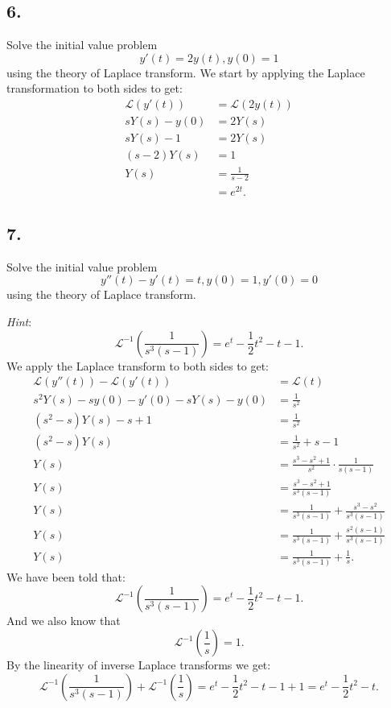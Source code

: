 \subsection*{6.} Solve the initial value problem
\[ 
y'(t) = 2y(t), y(0) = 1
\]
using the theory of Laplace transform.
\bigbreak
We start by applying the Laplace transformation to both sides to get:
\begin{align*}
  \mathcal{L}\left( y'(t) \right) &= \mathcal{L}\left( 2y(t) \right)  \\
  s Y(s) - y(0) &= 2Y(s) \\
  s Y(s) - 1 &= 2Y(s) \\
  \left( s-2 \right) Y(s) &= 1 \\
  Y(s) &= \frac{1}{s - 2} \\
  &=  e^{2t}
.\end{align*}



\subsection*{7.} Solve the initial value problem
\[ 
y''(t) - y'(t) = t, y(0) = 1, y'(0) = 0
\]
using the theory of Laplace transform.

\textit{Hint}:
\[ 
\mathcal{L}^{-1} \left( \frac{1}{s^3 \left( s-1 \right) } \right) = e^{t} - \frac{1}{2}t^2 - t - 1
.\]
\bigbreak
We apply the Laplace transform to both sides to get:
\begin{align*}
  \mathcal{L}\left( y''(t) \right) - \mathcal{L}\left( y'(t) \right) &= \mathcal{L}\left( t \right)  \\
  s^2 Y(s) - sy(0) - y'(0) - s Y(s) - y(0) &= \frac{1}{s^2} \\
  \left( s^2 - s \right) Y(s) - s + 1 &= \frac{1}{s^2} \\
  \left( s^2 - s \right) Y(s) &= \frac{1}{s^2} + s - 1 \\
  Y(s) &= \frac{s^3 - s^2 + 1}{s^2} \cdot \frac{1}{s \left( s - 1 \right) } \\
  Y(s) &= \frac{s^3 - s^2 + 1}{s^3 \left( s-1 \right) }  \\
  Y(s) &= \frac{1}{s^3 \left( s-1 \right) } + \frac{s^3 - s^2}{s^3 \left( s-1 \right) } \\
  Y(s) &= \frac{1}{s^3 \left( s-1 \right) } + \frac{s^2 \left( s-1 \right) }{s^3 \left( s-1 \right) } \\
  Y(s) &= \frac{1}{s^3 \left( s-1 \right) } + \frac{1}{s}
.\end{align*}
We have been told that:
\[ 
\mathcal{L}^{-1} \left( \frac{1}{s^3 \left( s-1 \right) } \right) = e^{t} - \frac{1}{2}t^2 - t - 1
.\]
And we also know that
\[ 
\mathcal{L}^{-1} \left( \frac{1}{s} \right) =  1
.\]
By the linearity of inverse Laplace transforms we get:
\[ 
\mathcal{L}^{-1}\left( \frac{1}{s^3 \left( s-1 \right) } \right) + \mathcal{L}^{-1} \left( \frac{1}{s} \right) = e^{t} - \frac{1}{2}t^2 - t - 1 + 1 = e^{t} - \frac{1}{2}t^2 - t
.\]

